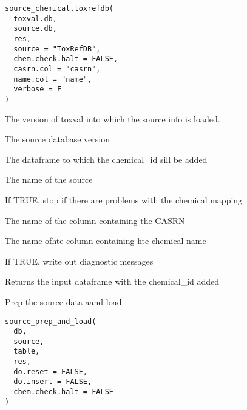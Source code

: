 \documentclass[letterpaper]{book}
\begin{document}
%
\begin{Usage}
\begin{verbatim}
source_chemical.toxrefdb(
  toxval.db,
  source.db,
  res,
  source = "ToxRefDB",
  chem.check.halt = FALSE,
  casrn.col = "casrn",
  name.col = "name",
  verbose = F
)
\end{verbatim}
\end{Usage}
%
\begin{Arguments}
\begin{ldescription}
\item[\code{toxval.db}] The version of toxval into which the source info is loaded.

\item[\code{source.db}] The source database version

\item[\code{res}] The dataframe to which the chemical\_id sill be added

\item[\code{source}] The name of the source

\item[\code{chem.check.halt}] If TRUE, stop if there are problems with the chemical mapping

\item[\code{casrn.col}] The name of the column containing the CASRN

\item[\code{name.col}] The name ofhte column containing hte chemical name

\item[\code{verbose}] If TRUE, write out diagnostic messages
\end{ldescription}
\end{Arguments}
%
\begin{Value}
Returns the input dataframe with the chemical\_id added
\end{Value}
%
\begin{Description}\relax
Prep the source data aand load
\end{Description}
%
\begin{Usage}
\begin{verbatim}
source_prep_and_load(
  db,
  source,
  table,
  res,
  do.reset = FALSE,
  do.insert = FALSE,
  chem.check.halt = FALSE
)
\end{verbatim}
\end{Usage}
%
\end{document}
